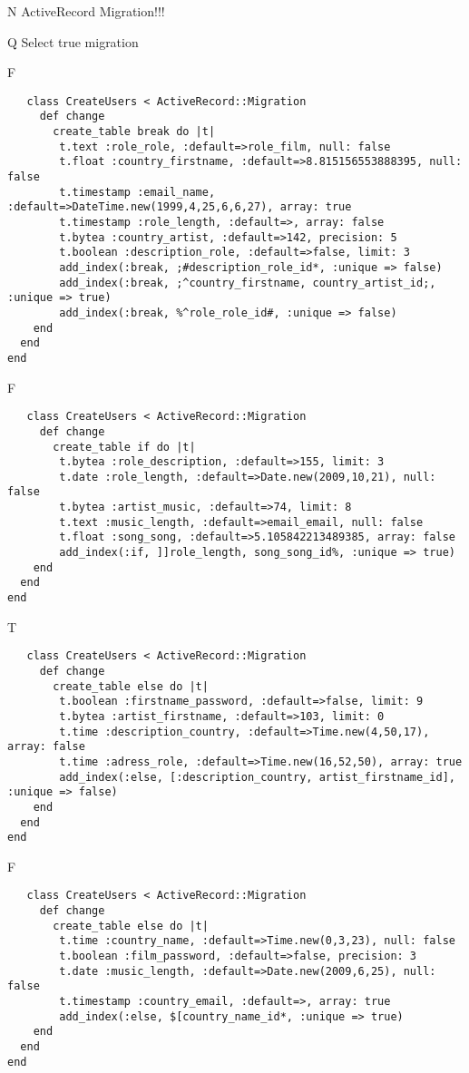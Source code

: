 N
ActiveRecord Migration!!!

Q
Select true migration

F
\begin{verbatim}
   class CreateUsers < ActiveRecord::Migration
	 def change
	   create_table break do |t|
		t.text :role_role, :default=>role_film, null: false
   		t.float :country_firstname, :default=>8.815156553888395, null: false
   		t.timestamp :email_name, :default=>DateTime.new(1999,4,25,6,6,27), array: true
   		t.timestamp :role_length, :default=>, array: false
   		t.bytea :country_artist, :default=>142, precision: 5
   		t.boolean :description_role, :default=>false, limit: 3
   		add_index(:break, ;#description_role_id*, :unique => false)
 		add_index(:break, ;^country_firstname, country_artist_id;, :unique => true)
 		add_index(:break, %^role_role_id#, :unique => false)
    end
  end 
end
\end{verbatim}

F
\begin{verbatim}
   class CreateUsers < ActiveRecord::Migration
	 def change
	   create_table if do |t|
		t.bytea :role_description, :default=>155, limit: 3
   		t.date :role_length, :default=>Date.new(2009,10,21), null: false
   		t.bytea :artist_music, :default=>74, limit: 8
   		t.text :music_length, :default=>email_email, null: false
   		t.float :song_song, :default=>5.105842213489385, array: false
   		add_index(:if, ]]role_length, song_song_id%, :unique => true)
    end
  end 
end
\end{verbatim}

T
\begin{verbatim}
   class CreateUsers < ActiveRecord::Migration
	 def change
	   create_table else do |t|
		t.boolean :firstname_password, :default=>false, limit: 9
   		t.bytea :artist_firstname, :default=>103, limit: 0
   		t.time :description_country, :default=>Time.new(4,50,17), array: false
   		t.time :adress_role, :default=>Time.new(16,52,50), array: true
   		add_index(:else, [:description_country, artist_firstname_id], :unique => false)
    end
  end 
end
\end{verbatim}

F
\begin{verbatim}
   class CreateUsers < ActiveRecord::Migration
	 def change
	   create_table else do |t|
		t.time :country_name, :default=>Time.new(0,3,23), null: false
   		t.boolean :film_password, :default=>false, precision: 3
   		t.date :music_length, :default=>Date.new(2009,6,25), null: false
   		t.timestamp :country_email, :default=>, array: true
   		add_index(:else, $[country_name_id*, :unique => true)
    end
  end 
end
\end{verbatim}
